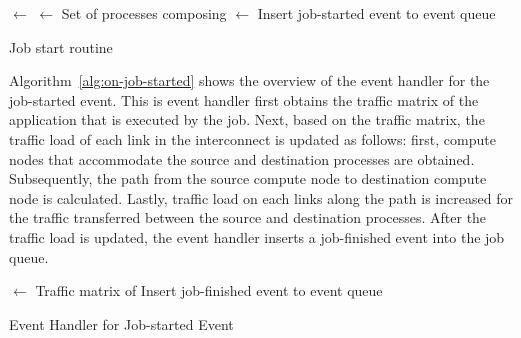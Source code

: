 \begin{algorithm}

    \Nodes $\gets$ \allocateNodes{\Job}\;
    \Procs $\gets$ Set of processes composing \Job\;
    \Mapping $\gets$ \mapProcs{\Procs, \Nodes}\;
    Insert job-started event to event queue\;

    \caption{Job start routine}%
    \label{alg:start-job}
\end{algorithm}

Algorithm~\ref{alg:on-job-started} shows the overview of the event handler for
the job-started event. This is event handler first obtains the traffic matrix
of the application that is executed by the job. Next, based on the traffic
matrix, the traffic load of each link in the interconnect is updated as
follows: first, compute nodes that accommodate the source and destination
processes are obtained. Subsequently, the path from the source compute node to
destination compute node is calculated. Lastly, traffic load on each links
along the path is increased for the traffic transferred between the source and
destination processes. After the traffic load is updated, the event handler
inserts a job-finished event into the job queue.

\begin{algorithm}

    \TrafficMatrix $\gets$ Traffic matrix of \Job\;
    Insert job-finished event to event queue\;

    \caption{Event Handler for Job-started Event}%
    \label{alg:on-job-started}
\end{algorithm}

